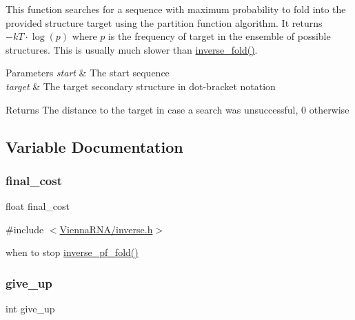 This function searches for a sequence with maximum probability to fold into the provided structure \textquotesingle{}target\textquotesingle{} using the partition function algorithm. It returns $-kT \cdot \log(p)$ where $p$ is the frequency of \textquotesingle{}target\textquotesingle{} in the ensemble of possible structures. This is usually much slower than \mbox{\hyperlink{group__inverse__fold_ga7af026de55d4babad879f2c92559cbbc}{inverse\+\_\+fold()}}.


\begin{DoxyParams}{Parameters}
{\em start} & The start sequence \\
\hline
{\em target} & The target secondary structure in dot-\/bracket notation \\
\hline
\end{DoxyParams}
\begin{DoxyReturn}{Returns}
The distance to the target in case a search was unsuccessful, 0 otherwise 
\end{DoxyReturn}


\subsection{Variable Documentation}
\mbox{\label{group__inverse__fold_ga7f17d3b169af048d32bb185039a9c09c}} 
\subsubsection{\texorpdfstring{final\_cost}{final\_cost}}
{\footnotesize\ttfamily float final\+\_\+cost}



{\ttfamily \#include $<$\mbox{\hyperlink{inverse_8h}{Vienna\+R\+N\+A/inverse.\+h}}$>$}

when to stop \mbox{\hyperlink{group__inverse__fold_gaeef52ecbf2a2450ad585a344f9826806}{inverse\+\_\+pf\+\_\+fold()}} \mbox{\label{group__inverse__fold_ga7ec4ba51f86e1717a1e174264e4a75ce}} 
\subsubsection{\texorpdfstring{give\_up}{give\_up}}
{\footnotesize\ttfamily int give\+\_\+up}



